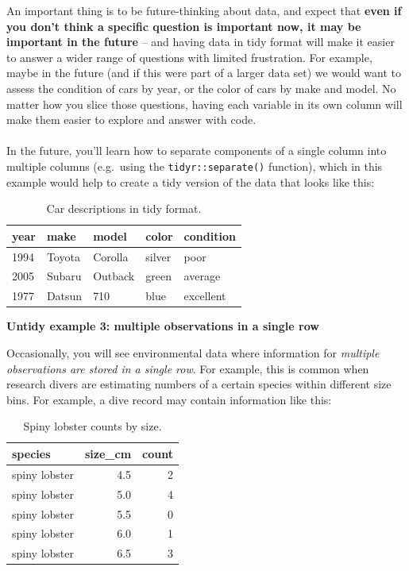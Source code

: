 \documentclass[
]{book}
\begin{document}
An important thing is to be future-thinking about data, and expect that \textbf{even if you don't think a specific question is important now, it may be important in the future} -- and having data in tidy format will make it easier to answer a wider range of questions with limited frustration. For example, maybe in the future (and if this were part of a larger data set) we would want to assess the condition of cars by year, or the color of cars by make and model. No matter how you slice those questions, having each variable in its own column will make them easier to explore and answer with code.\\
~\\
In the future, you'll learn how to separate components of a single column into multiple columns (e.g.~using the \texttt{tidyr::separate()} function), which in this example would help to create a tidy version of the data that looks like this:\\

\begin{table}

\caption{\label{tab:unnamed-chunk-6}Car descriptions in tidy format.}
\centering
\begin{tabular}[t]{l|l|l|l|l}
\hline
year & make & model & color & condition\\
\hline
1994 & Toyota & Corolla & silver & poor\\
\hline
2005 & Subaru & Outback & green & average\\
\hline
1977 & Datsun & 710 & blue & excellent\\
\hline
\end{tabular}
\end{table}

\textbf{Untidy example 3: multiple observations in a single row}

Occasionally, you will see environmental data where information for \emph{multiple observations are stored in a single row}. For example, this is common when research divers are estimating numbers of a certain species within different size bins. For example, a dive record may contain information like this:

\begin{table}

\caption{\label{tab:unnamed-chunk-7}Spiny lobster counts by size.}
\centering
\begin{tabular}[t]{l|r|r}
\hline
species & size\_cm & count\\
\hline
spiny lobster & 4.5 & 2\\
\hline
spiny lobster & 5.0 & 4\\
\hline
spiny lobster & 5.5 & 0\\
\hline
spiny lobster & 6.0 & 1\\
\hline
spiny lobster & 6.5 & 3\\
\hline
\end{tabular}
\end{table}
\end{document}
